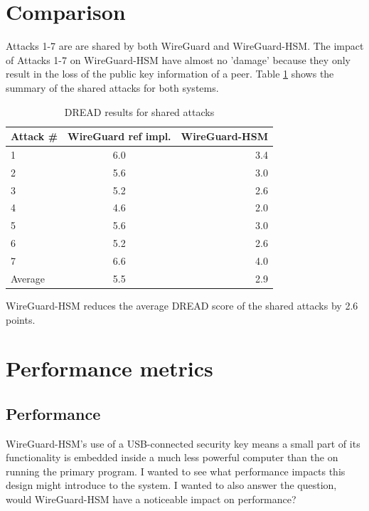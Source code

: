 \documentclass [11pt, proquest] {uwthesis}[2020/02/24]
\begin{document}
\section{Comparison}
Attacks 1-7 are are shared by both WireGuard and WireGuard-HSM. The impact of Attacks 1-7 on WireGuard-HSM have almost no 'damage' because they only result in the loss of the public key information of a peer. 
Table \ref{tab:DREAD_AVG} shows the summary of the shared attacks for both systems.

\begin{table}[h!]
  \begin{center}
    \caption{DREAD results for shared attacks}
    \label{tab:DREAD_AVG}
    \begin{tabular}{l|c|r} %
      \textbf{Attack \#} & \textbf{WireGuard ref impl.} & \textbf{WireGuard-HSM}\\
      \hline
      1 & 6.0 & 3.4\\
      2 & 5.6 & 3.0\\
      3 & 5.2 & 2.6\\
      4 & 4.6 & 2.0\\
      5 & 5.6 & 3.0\\
      6 & 5.2 & 2.6\\
      7 & 6.6 & 4.0\\
    \hline
    Average & 5.5 & 2.9\\
    \end{tabular}
  \end{center}
\end{table}

WireGuard-HSM reduces the average DREAD score of the shared attacks by 2.6 points.




\section{Performance metrics}

\subsection{Performance}
\label{performance}
WireGuard-HSM's use of a USB-connected security key means a small part of its functionality is embedded inside a much less powerful computer than the on running the primary program. I wanted to see what performance impacts this design might introduce to the system. I wanted to also answer the question, would WireGuard-HSM have a noticeable impact on performance?
\end{document}
